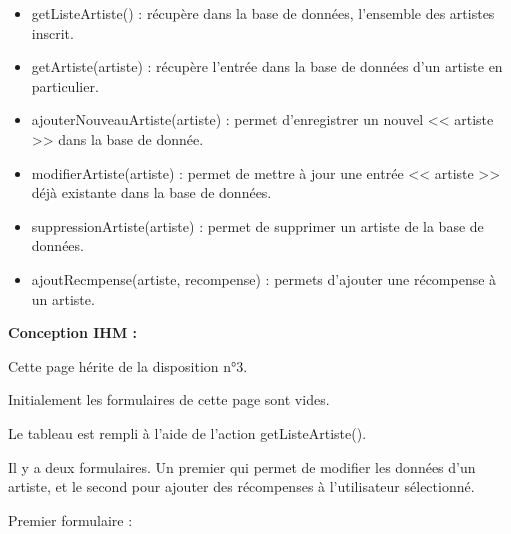 			\begin{paragraphe}
				\begin{itemize}
					\item getListeArtiste() : récupère dans la base de données, l'ensemble des artistes inscrit.
					\item getArtiste(artiste) : récupère l'entrée dans la base de données d'un artiste en particulier.
				\end{itemize}
			\end{paragraphe}

			\begin{paragraphe}
				\begin{itemize}
					\item ajouterNouveauArtiste(artiste) : permet d'enregistrer un nouvel << artiste >> dans la base de donnée.
					\item modifierArtiste(artiste) : permet de mettre à jour une entrée << artiste >> déjà existante dans la base de données.
					\item suppressionArtiste(artiste) : permet de supprimer un artiste de la base de données.
					\item ajoutRecmpense(artiste, recompense) : permets d'ajouter une récompense à un artiste.
				\end{itemize}
			\end{paragraphe}

			\begin{paragraphe}
				\textbf{Conception IHM :}
			\end{paragraphe}

			\begin{paragraphe}
				Cette page hérite de la disposition n°3. \par
				Initialement les formulaires de cette page sont vides.\par
				Le tableau est rempli à l'aide de l'action getListeArtiste().
			\end{paragraphe}


			\begin{paragraphe}
				Il y a deux formulaires. Un premier qui permet de modifier les données d'un artiste, et le second pour ajouter des récompenses à l'utilisateur sélectionné.
			\end{paragraphe}

			\begin{paragraphe}
				Premier formulaire :
			\end{paragraphe}

